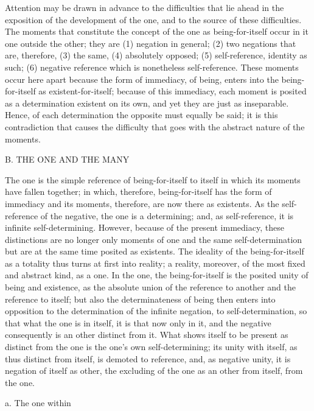 Attention may be drawn in advance
to the difficulties that lie ahead
in the exposition of the development of the one,
and to the source of these difficulties.
The moments that constitute the concept of
the one as being-for-itself
occur in it one outside the other;
they are
(1) negation in general;
(2) two negations that are, therefore,
(3) the same,
(4) absolutely opposed;
(5) self-reference, identity as such;
(6) negative reference which is nonetheless self-reference.
These moments occur here apart because
the form of immediacy, of being, enters into
the being-for-itself as existent-for-itself;
because of this immediacy, each moment is posited
as a determination existent on its own,
and yet they are just as inseparable.
Hence, of each determination the opposite must equally be said;
it is this contradiction that causes the difficulty
that goes with the abstract nature of the moments.

B. THE ONE AND THE MANY

The one is the simple reference
of being-for-itself to itself
in which its moments have fallen together;
in which, therefore, being-for-itself has the form
of immediacy and its moments,
therefore, are now there as existents.
As the self-reference of the negative,
the one is a determining;
and, as self-reference,
it is infinite self-determining.
However, because of the present immediacy,
these distinctions are no longer only moments
of one and the same self-determination
but are at the same time posited as existents.
The ideality of the being-for-itself as a totality
thus turns at first into reality;
a reality, moreover, of the most
fixed and abstract kind, as a one.
In the one, the being-for-itself is
the posited unity of being and existence,
as the absolute union of the reference to another
and the reference to itself;
but also the determinateness of being
then enters into opposition to the determination
of the infinite negation, to self-determination,
so that what the one is in itself,
it is that now only in it,
and the negative consequently is
an other distinct from it.
What shows itself to be present
as distinct from the one is
the one's own self-determining;
its unity with itself, as thus distinct from itself,
is demoted to reference, and, as negative unity,
it is negation of itself as other,
the excluding of the one
as an other from itself,
from the one.

a. The one within


